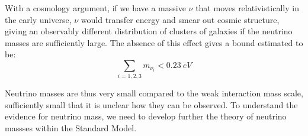 \documentclass[../../main/main.tex]{subfiles}
\begin{document}
With a cosmology argument, if we have a massive \( \nu \) that moves relativistically in the early universe, \( \nu \) would transfer energy and smear out cosmic structure, giving an observably different distribution of clusters of galaxies if the neutrino masses are sufficiently large. The absence of this effect gives a bound estimated to be:
\begin{equation}
	\sum_{i=1,2,3} m_{\nu_i}
	<
	0.23 \ \si{eV}
	\label{eq:}
\end{equation}





\bigskip
Neutrino masses are thus very small compared to the weak interaction mass scale, sufficiently small that it is unclear how they can be observed. To understand the evidence for neutrino mass, we need to develop further the theory of neutrino massses within the Standard Model.
\end{document}
